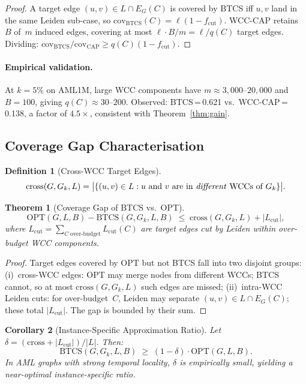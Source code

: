 \documentclass[11pt]{article}
\newtheorem{theorem}{Theorem}
\newtheorem{corollary}[theorem]{Corollary}
\newtheorem{definition}{Definition}
\begin{document}
\begin{proof}
A target edge $(u,v)\in L\cap E_G(C)$ is covered by BTCS iff $u,v$
land in the same Leiden sub-case, so
$\mathrm{cov}_{\mathrm{BTCS}}(C)=\ell(1-f_{\mathrm{cut}})$.
WCC-CAP retains~$B$ of~$m$ induced edges, covering at most
$\ell\cdot B/m=\ell/q(C)$ target edges.  Dividing:
$\mathrm{cov}_{\mathrm{BTCS}}/\mathrm{cov}_{\mathrm{CAP}}
\ge q(C)(1-f_{\mathrm{cut}})$.
\end{proof}

\paragraph{Empirical validation.}
At $k=5\%$ on AML1M, large WCC components have $m\approx3{,}000$--$20{,}000$
and $B=100$, giving $q(C)\approx30$--$200$.  Observed:
BTCS\,=\,0.621 vs.\ WCC-CAP\,=\,0.138, a factor of $4.5\times$,
consistent with Theorem~\ref{thm:gain}.

\subsection{Coverage Gap Characterisation}

\begin{definition}[Cross-WCC Target Edges]
\[
  \mathrm{cross}(G,G_k,L)
  =\bigl|\{(u,v)\in L : u\text{ and }v\text{ are in \emph{different} WCCs of }G_k\}\bigr|.
\]
\end{definition}

\begin{theorem}[Coverage Gap of BTCS vs.\ OPT]\label{thm:gap}
\[
  \mathrm{OPT}(G,L,B)-\mathrm{BTCS}(G,G_k,L,B)
  \;\le\;\mathrm{cross}(G,G_k,L)+|L_{\mathrm{cut}}|,
\]
where $L_{\mathrm{cut}}=\sum_{C\;\text{over-budget}}L_{\mathrm{cut}}(C)$
are target edges cut by Leiden within over-budget WCC components.
\end{theorem}

\begin{proof}
Target edges covered by OPT but not BTCS fall into two disjoint groups:
(i)~cross-WCC edges: OPT may merge nodes from different WCCs; BTCS cannot,
    so at most $\mathrm{cross}(G,G_k,L)$ such edges are missed;
(ii)~intra-WCC Leiden cuts: for over-budget~$C$, Leiden may separate
    $(u,v)\in L\cap E_G(C)$; these total $|L_{\mathrm{cut}}|$.
The gap is bounded by their sum.
\end{proof}

\begin{corollary}[Instance-Specific Approximation Ratio]\label{cor:approx}
Let $\delta=(\mathrm{cross}+|L_{\mathrm{cut}}|)/|L|$.  Then:
\[
  \mathrm{BTCS}(G,G_k,L,B)\;\ge\;(1-\delta)\cdot\mathrm{OPT}(G,L,B).
\]
In AML graphs with strong temporal locality, $\delta$ is empirically
small, yielding a near-optimal instance-specific ratio.
\end{corollary}
\end{document}
